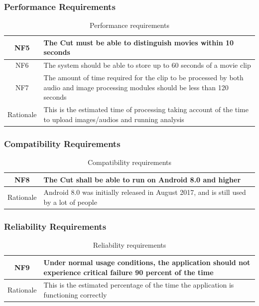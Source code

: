 \documentclass[titlepage]{article}
\begin{document}
\subsubsection{Performance Requirements}
\begin{table}[H]
    \centering
    \begin{tabularx}{\textwidth}{|c|X|} \hline
        NF5 & The Cut must be able to distinguish movies within 10 seconds \\ \hline
        NF6 & The system should be able to store up to 60 seconds of a movie clip \\ \hline
        NF7 & The amount of time required for the clip to be processed by both audio and image processing modules should be less than 120 seconds \\ \hline
        Rationale & This is the estimated time of processing taking account of the time to upload images/audios and running analysis \\ \hline
    \end{tabularx}
    \caption{Performance requirements}
    \label{tab:NonFunctional-performance}
\end{table}

\subsubsection{Compatibility Requirements}
\begin{table}[H]
    \centering
    \begin{tabularx}{\textwidth}{|c|X|} \hline
        NF8 & The Cut shall be able to run on Android 8.0 and higher \\ \hline
        Rationale & Android 8.0 was initially released in August 2017, and is still used by a lot of people \\ \hline
    \end{tabularx}
    \caption{Compatibility requirements}
    \label{tab:NonFunctional-compatibility}
\end{table}

\subsubsection{Reliability Requirements}
\begin{table}[H]
    \centering
    \begin{tabularx}{\textwidth}{|c|X|} \hline
        NF9 & Under normal usage conditions, the application should not experience critical failure 90 percent of the time \\ \hline
        Rationale & This is the estimated percentage of the time the application is functioning correctly \\ \hline
    \end{tabularx}
    \caption{Reliability requirements}
    \label{tab:NonFunctional-reliability}
\end{table}
\end{document}
